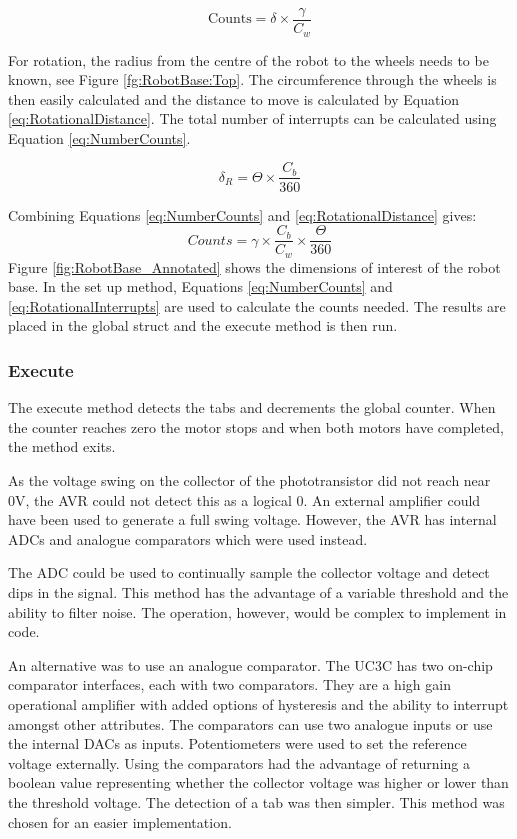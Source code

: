 \begin{equation}
\label{eq:NumberCounts}
\text{Counts} = \delta \times \frac{\gamma}{C_w}
\end{equation}

For rotation, the radius from the centre of the robot to the wheels needs to be known, see Figure \ref{fg:RobotBase:Top}. The circumference through the wheels is then easily calculated and the distance to move is calculated by Equation \eqref{eq:RotationalDistance}. The total number of interrupts can be calculated using Equation \eqref{eq:NumberCounts}. 

\begin{equation}
\label{eq:RotationalDistance}
\delta_{R} = \Theta \times \frac{C_b}{360}
\end{equation}

Combining Equations \eqref{eq:NumberCounts} and \eqref{eq:RotationalDistance} gives:
\begin{equation}
\label{eq:RotationalInterrupts}
Counts = \gamma \times \frac{C_b}{C_w} \times \frac{\Theta}{360}
\end{equation}
Figure \ref{fig:RobotBase_Annotated} shows the dimensions of interest of the robot base. In the set up method, Equations \eqref{eq:NumberCounts} and \eqref{eq:RotationalInterrupts} are used to calculate the counts needed. The results are placed in the global struct and the execute method is then run.

\subsubsection{Execute}

The execute method detects the tabs and decrements the global counter. When the counter reaches zero the motor stops and when both motors have completed, the method exits.

As the voltage swing on the collector of the phototransistor did not reach near 0V, the AVR could not detect this as a logical 0. An external amplifier could have been used to generate a full swing voltage. However, the AVR has internal ADCs and analogue comparators which were used instead. 

The ADC could be used to continually sample the collector voltage and detect dips in the signal. This method has the advantage of a variable threshold and the ability to filter noise. The operation, however, would be complex to implement in code. 

An alternative was to use an analogue comparator. The UC3C has two on-chip comparator interfaces, each with two comparators. They are a high gain operational amplifier with added options of hysteresis and the ability to interrupt amongst other attributes. The comparators can use two analogue inputs or use the internal DACs as inputs. Potentiometers were used to set the reference voltage externally. Using the comparators had the advantage of returning a boolean value representing whether the collector voltage was higher or lower than the threshold voltage. The detection of a tab was then simpler. This method was chosen for an easier implementation.

